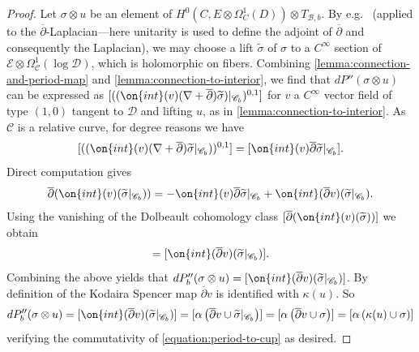 \documentclass[12 pt]{amsart}
\theoremstyle{plain}
\theoremstyle{definition}
\theoremstyle{remark}
\numberwithin{equation}{section}
\begin{document}
\begin{proof}
Let $\sigma\otimes u$ be an element of $H^0( C, E \otimes \Omega^1_{ C}(D)) \otimes
			T_{\mathscr B,b}$. By e.g.~\cite[Proposition
			9.22]{Voisin:hodgeTheory} (applied to the
			$\overline\partial$-Laplacian---here unitarity is used
		to define the adjoint of $\overline\partial$ and consequently
	the Laplacian), we may choose a lift $\widetilde\sigma$ of $\sigma$ to a $C^\infty$ section of $\mathscr{E}\otimes \Omega^1_{\mathscr{C}}(\log \mathscr{D})$, which is holomorphic on fibers.
	Combining \autoref{lemma:connection-and-period-map} and
	\autoref{lemma:connection-to-interior}, we find that $dP''(\sigma
	\otimes u)$
	can be expressed as $[((\on{int}(v)(\nabla+\overline{\partial})\widetilde{\sigma})|_{\mathscr C_b})^{0,1}]$ for
$v$ a $C^\infty$ vector field of type $(1,0)$ tangent to $\mathscr{D}$ and lifting $u$, as in \autoref{lemma:connection-to-interior}. 
As $\mathscr{C}$ is a relative curve, for degree reasons we have
$$[((\on{int}(v)(\nabla+\overline{\partial})\widetilde{\sigma}|_{\mathscr C_b}))^{0,1}]=[\on{int}(v)\overline{\partial}\widetilde{\sigma}|_{\mathscr C_b}].$$
Direct computation gives
\begin{align*}
	\overline{\partial} (\on{int}(v) (\widetilde{\sigma}|_{\mathscr{C}_b})) = 
	- \on{int}(v)\overline{\partial}\widetilde{\sigma}|_{\mathscr C_b}
	+ \on{int}(\overline{\partial} v)(\widetilde{\sigma}|_{\mathscr{C}_b}).
\end{align*}
Using the vanishing of 
the Dolbeault cohomology class $[\overline{\partial} (\on{int}(v)
(\widetilde{\sigma}))]$
we obtain 
\begin{align*}
	[\on{int}(v)(\overline{\partial}\widetilde{\sigma}|_{\mathscr C_b})]
	=
	[\on{int}(\overline{\partial}v)(\widetilde{\sigma}|_{\mathscr C_b})].
\end{align*}
Combining the above yields that $dP''_b(\sigma\otimes u) = 
[\on{int}(\overline{\partial}v)(\widetilde{\sigma}|_{\mathscr C_b})]$.
By definition of the Kodaira Spencer map 
$\overline{\partial}v$ is identified with $\kappa(u)$.
So
\begin{align*}
dP''_b(\sigma \otimes u) =
[\on{int}(\overline{\partial}v)(\widetilde{\sigma}|_{\mathscr C_b})]
=
[\alpha\left( \overline{\partial}v \cup \widetilde{\sigma}|_{\mathscr C_b}\right)]
=
[\alpha\left( \overline{\partial}v\cup \sigma \right)]
=
[\alpha\left( \kappa(u) \cup \sigma \right)]
\end{align*}
verifying the commutativity of
\eqref{equation:period-to-cup} as desired.
\end{proof}
\end{document}
